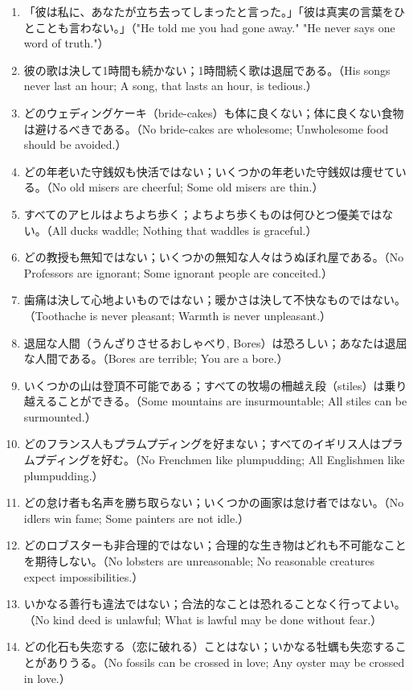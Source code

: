 \documentclass[a4paper,11pt,openany]{ltjsbook}
\begin{document}
\begin{enumerate}[label=\textbf{\arabic*.}]
\item 「彼は私に、あなたが立ち去ってしまったと言った。」「彼は真実の言葉をひとことも言わない。」（"He told me you had gone away." "He never says one word of truth."）
\item 彼の歌は決して1時間も続かない；1時間続く歌は退屈である。（His songs never last an hour; A song, that lasts an hour, is tedious.）
\item どのウェディングケーキ（bride-cakes）も体に良くない；体に良くない食物は避けるべきである。（No bride-cakes are wholesome; Unwholesome food should be avoided.）
\item どの年老いた守銭奴も快活ではない；いくつかの年老いた守銭奴は痩せている。（No old misers are cheerful; Some old misers are thin.）
\item すべてのアヒルはよちよち歩く；よちよち歩くものは何ひとつ優美ではない。（All ducks waddle; Nothing that waddles is graceful.）
\item どの教授も無知ではない；いくつかの無知な人々はうぬぼれ屋である。（No Professors are ignorant; Some ignorant people are conceited.）
\item 歯痛は決して心地よいものではない；暖かさは決して不快なものではない。（Toothache is never pleasant; Warmth is never unpleasant.）
\item 退屈な人間（うんざりさせるおしゃべり, Bores）は恐ろしい；あなたは退屈な人間である。（Bores are terrible; You are a bore.）
\item いくつかの山は登頂不可能である；すべての牧場の柵越え段（stiles）は乗り越えることができる。（Some mountains are insurmountable; All stiles can be surmounted.）
\item どのフランス人もプラムプディングを好まない；すべてのイギリス人はプラムプディングを好む。（No Frenchmen like plumpudding; All Englishmen like plumpudding.）
\item どの怠け者も名声を勝ち取らない；いくつかの画家は怠け者ではない。（No idlers win fame; Some painters are not idle.）
\item どのロブスターも非合理的ではない；合理的な生き物はどれも不可能なことを期待しない。（No lobsters are unreasonable; No reasonable creatures expect impossibilities.）
\item いかなる善行も違法ではない；合法的なことは恐れることなく行ってよい。（No kind deed is unlawful; What is lawful may be done without fear.）
\item どの化石も失恋する（恋に破れる）ことはない；いかなる牡蠣も失恋することがありうる。（No fossils can be crossed in love; Any oyster may be crossed in love.）

\end{enumerate}
\end{document}
